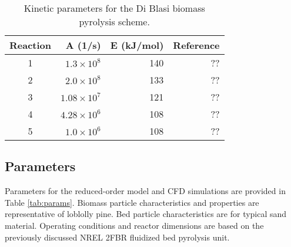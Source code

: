 \begin{table}[H]
    \centering
    \caption{Kinetic parameters for the Di Blasi biomass pyrolysis scheme.}
    \begin{tabular}{crrr}
        \hline
        Reaction    & A (1/s)               & E (kJ/mol)    & Reference     \\
        \hline
        1           & $1.3 \times 10^8$     & 140           & ??            \\
        2           & $2.0 \times 10^8$     & 133           & ??            \\
        3           & $1.08 \times 10^7$    & 121           & ??            \\
        4           & $4.28 \times 10^6$    & 108           & ??            \\
        5           & $1.0 \times 10^6$     & 108           & ??            \\
        \hline
    \end{tabular}
\end{table}

\subsection{Parameters}

Parameters for the reduced-order model and CFD simulations are provided in Table \ref{tab:params}. Biomass particle characteristics and properties are representative of loblolly pine. Bed particle characteristics are for typical sand material. Operating conditions and reactor dimensions are based on the previously discussed NREL 2FBR fluidized bed pyrolysis unit.

